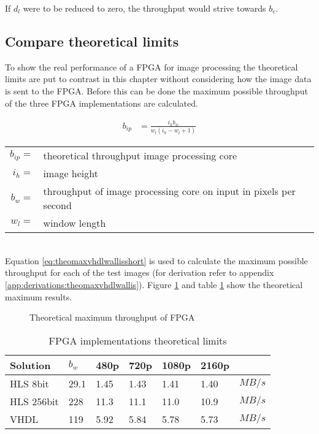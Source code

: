 If $d_l$ were to be reduced to zero, the throughput would strive towards $b_e$.

\subsection{Compare theoretical limits}
To show the real performance of a FPGA for image processing the theoretical
limits are put to contrast in this chapter without considering how the image
data is sent to the FPGA.
Before this can be done the maximum possible throughput of the three FPGA
implementations are calculated.

\begin{align}
    b_{ip}  & = \frac{i_hb_w}{w_l (i_h-w_l+1)}
    \label{eq:theomaxvhdlwallisshort}
\end{align}

\begin{tabular}{rl}
    $b_{ip}=$ & theoretical throughput image processing core \\
    $i_h   =$ & image height \\
    $b_w   =$ & throughput of image processing core on input in pixels per
    second \\
    $w_l   =$ & window length \\
\end{tabular} \\

Equation \ref{eq:theomaxvhdlwallisshort} is used to calculate the maximum
possible throughput for each of the test images (for derivation refer to
appendix \ref{app:derivations:theomaxvhdlwallis}). Figure \ref{fig:theoresults}
and table \ref{tab:FPGAimplementationstheoreticallimits} show the theoretical
maximum results.

\begin{figure}[b!]
    \centering
    \begin{adjustbox}{max width=\linewidth}
        
    \end{adjustbox}
    \caption{Theoretical maximum throughput of FPGA}
    \label{fig:theoresults}
\end{figure}

\begin{table}[b!]
    \centering
    \begin{tabular}{l l l l l l l}
        \toprule
        Solution & $b_w$ & 480p & 720p & 1080p & 2160p & \\
        \midrule
        HLS 8bit       & 29.1 & 1.45 & 1.43 & 1.41 & 1.40 & $MB/s$\\
        HLS 256bit     & 228  & 11.3 & 11.1 & 11.0 & 10.9 & $MB/s$\\
        VHDL           & 119  & 5.92 & 5.84 & 5.78 & 5.73 & $MB/s$\\
        \bottomrule
    \end{tabular}
    \caption{FPGA implementations theoretical limits}
    \label{tab:FPGAimplementationstheoreticallimits}
\end{table}

